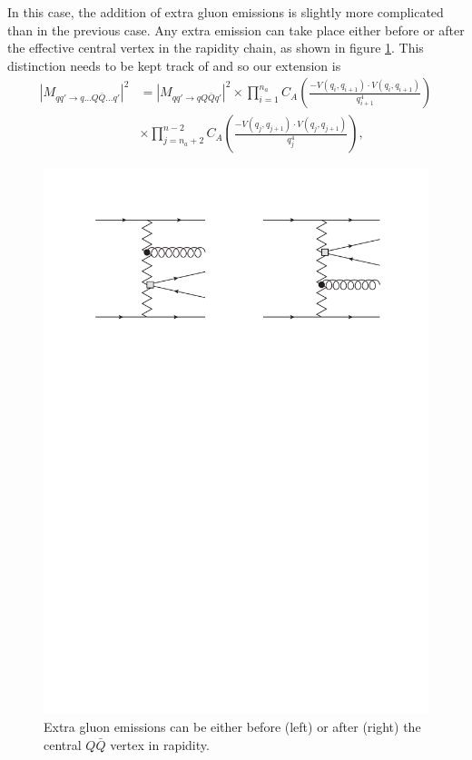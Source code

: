In this case, the addition of extra gluon emissions is slightly more complicated than in the previous case. Any extra emission can take place either before or after the effective central vertex in the rapidity chain, as shown in figure \ref{fig:5jet_choice}. This distinction needs to be kept track of and so our extension is
\begin{equation}
\begin{split}
|M_{qq' \to q...Q\bar{Q}...q'}|^2 &= |M_{qq' \to qQ\bar{Q}q'}|^2 \times \prod_{i=1}^{n_a} C_A \left(\frac{-V(q_i,q_{i+1}) \cdot V(q_i,q_{i+1})}{q_{i+1}^4} \right) \\
&\times \prod_{j=n_a+2}^{n-2} C_A \left(\frac{-V(q_j,q_{j+1}) \cdot V(q_j,q_{j+1})}{q_j^4} \right),
\end{split}
\end{equation}
\begin{figure}[t]
\centering
\includegraphics[scale=0.75]{Images/5jet_choice.pdf}
\caption{Extra gluon emissions can be either before (left) or after (right) the central $Q\bar{Q}$ vertex in rapidity.}
\label{fig:5jet_choice}
\end{figure}
